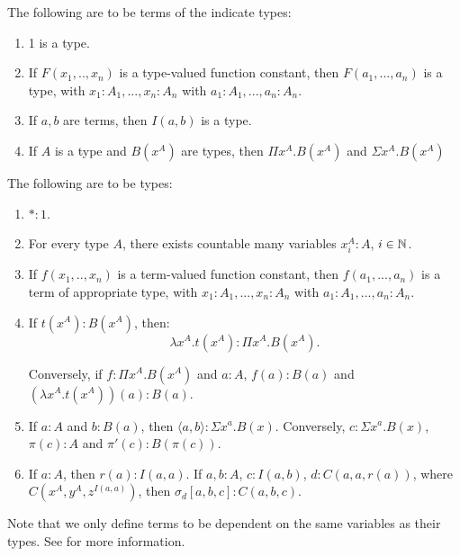 \begin{definition}
  The following are to be terms of the indicate types:
  \begin{enumerate}
  \item 1 is a type.
  \item If $F(x_1,..,x_n)$ is a type-valued function constant, then $F(a_1,...,a_n)$ is a type, with  $x_1:A_1,...,x_n:A_n$ with $a_1:A_1,...,a_n:A_n$.
  \item If $a,b$ are terms, then $I(a,b)$ is a type.
  \item If $A$ is a type and $B(x^A)$ are types, then $\Pi x^A. B(x^A)$ and  $\Sigma x^A. B(x^A)$
  \end{enumerate}
\end{definition}

\begin{definition}\label{1.1.2-seely}
  The following are to be types:
  \begin{enumerate}
  \item $*:1$.
  \item For every type $A$, there exists countable many variables $x_i^A : A$, $i\in \mathbb{N}$.
  \item If $f(x_1,..,x_n)$ is a term-valued function constant, then $f(a_1,...,a_n)$ is a term of appropriate type, with  $x_1:A_1,...,x_n:A_n$ with $a_1:A_1,...,a_n:A_n$.
  \item If $t(x^A) : B(x^A)$, then:
    $$\lambda x^A.t(x^A) : \Pi x^A. B(x^A).$$

    Conversely, if $f : \Pi x^A. B(x^A)$ and $a:A$, $f(a) : B(a)$ and $(\lambda x^A.t(x^A))(a) : B(a)$.
  \item If $a:A$ and $b:B(a)$, then $\langle a, b\rangle : \Sigma x^a. B(x)$. Conversely, $c : \Sigma x^a. B(x)$, $\pi (c) : A$ and $\pi'(c) : B(\pi(c))$. 
  \item If $a:A$, then $r(a): I(a,a)$. If $a,b : A$, $c : I(a,b)$, $d : C(a,a,r(a))$, where $C(x^A,y^A,z^{I(a,a)})$, then $\sigma_d[a,b,c] : C(a,b,c)$.  
  \end{enumerate}
\end{definition}

\begin{remark}
  Note that we only define terms to be dependent on the same variables as their types. See \cite[Section 2.2]{martinlof1973intuitionistic} for more information.
\end{remark}

